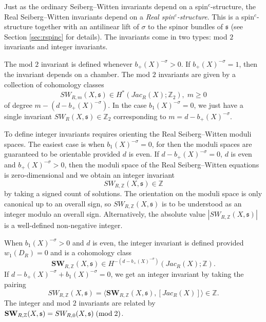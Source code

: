 \documentclass{amsart}
\theoremstyle{definition}
\theoremstyle{remark}
\numberwithin{equation}{section}
\begin{document}
Just as the ordinary Seiberg--Witten invariants depend on a spin$^c$-structure, the Real Seiberg--Witten invariants depend on a {\em Real spin$^c$-structure}. This is a spin$^c$-structure together with an antilinear lift of $\sigma$ to the spinor bundles of $\mathfrak{s}$ (see Section \ref{sec:rspinc} for details). The invariants come in two types: mod $2$ invariants and integer invariants.

 The mod $2$ invariant is defined whenever $b_+(X)^{-\sigma} > 0$. If $b_+(X)^{-\sigma} = 1$, then the invariant depends on a chamber. The mod $2$ invariants are given by a collection of cohomology classes
\[
SW_{R,m}(X,\mathfrak{s}) \in H^*(Jac_R(X) ; \mathbb{Z}_2), \; m \ge 0
\]
of degree $m - (d - b_+(X)^{-\sigma})$. In the case $b_1(X)^{-\sigma} = 0$, we just have a single invariant $SW_R(X,\mathfrak{s}) \in \mathbb{Z}_2$ corresponding to $m = d-b_+(X)^{-\sigma}$.

 To define integer invariants requires orienting the Real Seiberg--Witten moduli spaces. The easiest case is when $b_1(X)^{-\sigma} = 0$, for then the moduli spaces are guaranteed to be orientable provided $d$ is even. If $d - b_+(X)^{-\sigma} = 0$, $d$ is even and $b_+(X)^{-\sigma} > 0$, then the moduli space of the Real Seiberg--Witten equations is zero-dimensional and we obtain an integer invariant
\[
SW_{R,\mathbb{Z}}(X,\mathfrak{s}) \in \mathbb{Z}
\]
by taking a signed count of solutions. The orientation on the moduli space is only canonical up to an overall sign, so $SW_{R,\mathbb{Z}}(X,\mathfrak{s})$ is to be understood as an integer modulo an overall sign. Alternatively, the absolute value $|SW_{R,\mathbb{Z}}(X,\mathfrak{s})|$ is a well-defined non-negative integer.

When $b_1(X)^{-\sigma} > 0$ and $d$ is even, the integer invariant is defined provided $w_1(D_R) = 0$ and is a cohomology class
\[
\mathbf{SW}_{R,\mathbb{Z}}(X,\mathfrak{s}) \in H^{-(d-b_+(X)^{-\sigma})}( Jac_R(X) ; \mathbb{Z} ).
\]
If $d - b_+(X)^{-\sigma} + b_1(X)^{-\sigma} = 0$, we get an integer invariant by taking the pairing
\[
SW_{R,\mathbb{Z}}(X,\mathfrak{s}) = \langle \mathbf{SW}_{R,\mathbb{Z}}(X,\mathfrak{s}) , [Jac_R(X)] \rangle \in \mathbb{Z}.
\]
The integer and mod $2$ invariants are related by $\mathbf{SW}_{R,\mathbb{Z}}(X,\mathfrak{s}) = SW_{R,0}(X,\mathfrak{s}) \; ({\rm mod} \; 2)$.
\end{document}
